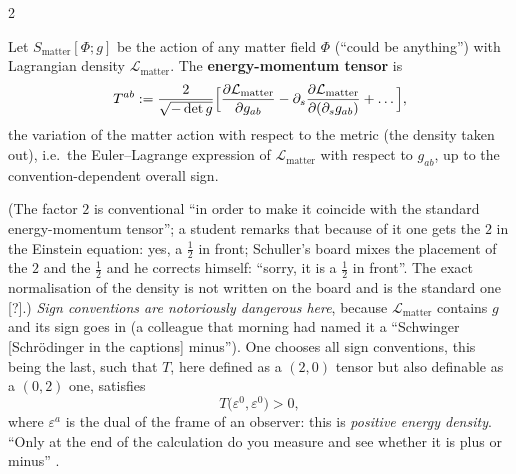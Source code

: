 \begin{paracol}{2}
\begin{definition}\label{def:c14-emt}
Let $S_{\mathrm{matter}}[\Phi;g]$ be the action of any matter field $\Phi$ (``could be anything'') with Lagrangian density $\mathcal L_{\mathrm{matter}}$. The \textbf{energy-momentum tensor} is
\[
  T^{ab}:=\frac{2}{\sqrt{-\det g}}\Bigl[\frac{\partial\mathcal L_{\mathrm{matter}}}{\partial g_{ab}}-\partial_s\frac{\partial\mathcal L_{\mathrm{matter}}}{\partial(\partial_sg_{ab})}+\dots\Bigr],
\]
the variation of the matter action with respect to the metric (the density taken out), i.e.\ the Euler--Lagrange expression of $\mathcal L_{\mathrm{matter}}$ with respect to $g_{ab}$, up to the convention-dependent overall sign.
\end{definition}
(The factor $2$ is conventional ``in order to make it coincide with the standard energy-momentum tensor''; a student remarks that because of it one gets the $2$ in the Einstein equation: yes, a $\tfrac12$ in front; Schuller's board mixes the placement of the $2$ and the $\tfrac12$ and he corrects himself: ``sorry, it is a $\tfrac12$ in front''. The exact normalisation of the density is not written on the board and is the standard one [?].) \emph{Sign conventions are notoriously dangerous here}, because $\mathcal L_{\mathrm{matter}}$ contains $g$ and its sign goes in (a colleague that morning had named it a ``Schwinger [Schr\"odinger in the captions] minus''). One chooses all sign conventions, this being the last, such that $T$, here defined as a $(2,0)$ tensor but also definable as a $(0,2)$ one, satisfies
\[
  T\bigl(\varepsilon^0,\varepsilon^0\bigr)>0,
\]
where $\varepsilon^a$ is the dual of the frame of an observer: this is \emph{positive energy density}. ``Only at the end of the calculation do you measure and see whether it is plus or minus'' .


\end{paracol}
